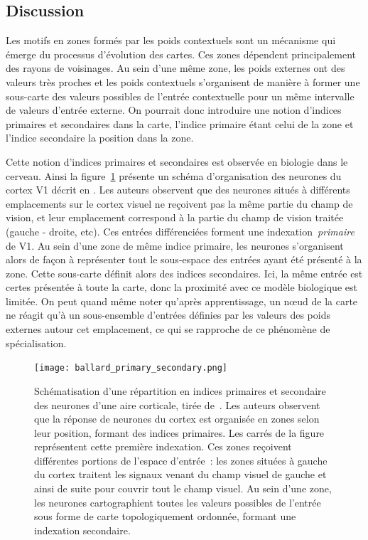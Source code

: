 \documentclass[../main]{subfiles}
\begin{document}
\subsection{Discussion}

Les motifs en zones formés par les poids contextuels sont un mécanisme qui émerge du processus d'évolution des cartes. Ces zones dépendent principalement des rayons de voisinages.
Au sein d'une même zone, les poids externes ont des valeurs très proches et les poids contextuels s'organisent de manière à former une sous-carte des valeurs possibles de l'entrée contextuelle pour un même intervalle de valeurs d'entrée externe.
On pourrait donc introduire une notion d'indices primaires et secondaires dans la carte, l'indice primaire étant celui de la zone et l'indice secondaire la position dans la zone.


Cette notion d'indices primaires et secondaires est observée en biologie dans le cerveau. 
Ainsi la figure~\ref{fig:ballard} présente un schéma d'organisation des neurones du cortex V1 décrit en \cite{ballard_cortical_1986}.
Les auteurs observent que des neurones situés à différents emplacements sur le cortex visuel ne reçoivent pas la même partie du champ de vision, et leur emplacement correspond à la partie du champ de vision traitée (gauche - droite, etc).
Ces entrées différenciées forment une indexation~\emph{primaire} de V1. 
Au sein d'une zone de même indice primaire, les neurones s'organisent alors de façon à représenter tout le sous-espace des entrées ayant été présenté à la zone. Cette sous-carte définit alors des indices secondaires.
Ici, la même entrée est certes présentée à toute la carte, donc la proximité avec ce modèle biologique est limitée. On peut quand même noter qu'après apprentissage, un n\oe{}ud de la carte ne réagit qu'à un sous-ensemble d'entrées définies par les valeurs des poids externes autour cet emplacement, ce qui se rapproche de ce phénomène de spécialisation.


\begin{figure}[H]
	\centering\texttt{[image: ballard\_primary\_secondary.png]}
	\caption{Schématisation d'une répartition en indices primaires et secondaire des neurones d'une aire corticale, tirée de~\cite{ballard_cortical_1986}. 
	Les auteurs observent que la réponse de neurones du cortex est organisée en zones selon leur position, formant des indices primaires. Les carrés de la figure représentent cette première indexation.
	Ces zones reçoivent différentes portions de l'espace d'entrée~: les zones situées à gauche du cortex traitent les signaux venant du champ visuel de gauche et ainsi de suite pour couvrir tout le champ visuel.
	Au sein d'une zone, les neurones cartographient toutes les valeurs possibles de l'entrée sous forme de carte topologiquement ordonnée, formant une indexation secondaire. \label{fig:ballard}}
\end{figure}
\end{document}
